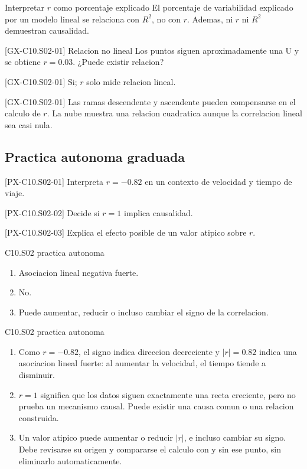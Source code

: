 \begin{commonerror}{Interpretar \(r\) como porcentaje explicado}
El porcentaje de variabilidad explicado por un modelo lineal se relaciona con \(R^2\), no con
\(r\). Ademas, ni \(r\) ni \(R^2\) demuestran causalidad.
\end{commonerror}

\begin{guidedexercise}{[GX-C10.S02-01] Relacion no lineal}
Los puntos siguen aproximadamente una U y se obtiene \(r=0.03\). ¿Puede existir relacion?
\end{guidedexercise}
\begin{shortanswer}{[GX-C10.S02-01]} Si; \(r\) solo mide relacion lineal. \end{shortanswer}
\begin{fullsolution}{[GX-C10.S02-01]}
Las ramas descendente y ascendente pueden compensarse en el calculo de \(r\). La nube muestra
una relacion cuadratica aunque la correlacion lineal sea casi nula.
\end{fullsolution}

\subsection*{Practica autonoma graduada}
\begin{exercise}{[PX-C10.S02-01] Interpreta \(r=-0.82\) en un contexto de velocidad y tiempo de viaje.}\end{exercise}
\begin{exercise}{[PX-C10.S02-02] Decide si \(r=1\) implica causalidad.}\end{exercise}
\begin{exercise}{[PX-C10.S02-03] Explica el efecto posible de un valor atipico sobre \(r\).}\end{exercise}
\begin{shortanswer}{C10.S02 practica autonoma}
\begin{enumerate}
  \item Asociacion lineal negativa fuerte.
  \item No.
  \item Puede aumentar, reducir o incluso cambiar el signo de la correlacion.
\end{enumerate}
\end{shortanswer}
\begin{fullsolution}{C10.S02 practica autonoma}
\begin{enumerate}
  \item Como \(r=-0.82\), el signo indica direccion decreciente y \(|r|=0.82\) indica una
  asociacion lineal fuerte: al aumentar la velocidad, el tiempo tiende a disminuir.
  \item \(r=1\) significa que los datos siguen exactamente una recta creciente, pero no prueba
  un mecanismo causal. Puede existir una causa comun o una relacion construida.
  \item Un valor atipico puede aumentar o reducir \(|r|\), e incluso cambiar su signo. Debe
  revisarse su origen y compararse el calculo con y sin ese punto, sin eliminarlo automaticamente.
\end{enumerate}
\end{fullsolution}

